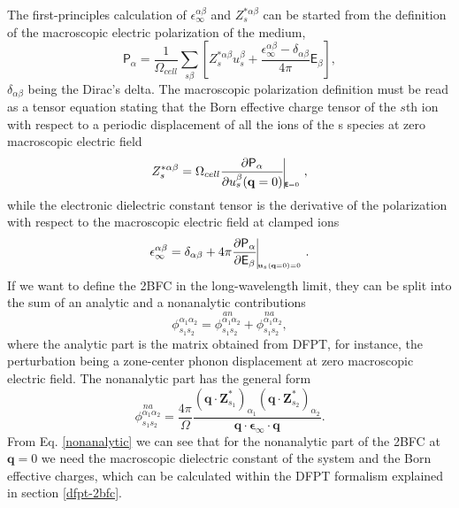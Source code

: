 The first-principles calculation of $\epsilon_{\infty}^{\alpha\beta}$ and $Z_{s}^{*\alpha\beta}$ can be started from the definition of the macroscopic electric polarization of the medium, 
\begin{equation}
 \mathsf{P}_{\alpha}=\frac{1}{\Omega_{cell}}\sum_{s\beta}\left[Z^{*\alpha\beta}_{s}u_{s}^{\beta}+\frac{\epsilon_{\infty}^{\alpha\beta}-\delta_{\alpha\beta}}{4\pi}\mathsf{E}_{\beta}\right],
\end{equation}
$\delta_{\alpha\beta}$ being the Dirac's delta. The macroscopic polarization definition must be read as a tensor equation stating that the Born effective charge tensor of the $s$th ion with respect to a periodic displacement of 
all the ions of the s species at zero macroscopic electric field
\begin{equation}
 Z^{*\alpha\beta}_{s}=\Omega_{cell}\frac{\partial \mathsf{P}_{\alpha}}{\partial u_{s}^{\beta}(\mathbf{q}=0)}\vline_{_{_{_{_{_{_{_{\boldsymbol{\mathsf{E}}=0}}}}}}}},
\end{equation}
while the electronic dielectric constant tensor is the derivative of the polarization with respect to the macroscopic electric field at clamped ions
\begin{equation}
 \epsilon_{\infty}^{\alpha\beta}=\delta_{\alpha\beta}+4\pi\frac{\partial\mathsf{P}_{\alpha}}{\partial\mathsf{E}_{\beta}}\vline_{_{_{_{_{_{_{_{\mathbf{u}_{s}(\mathbf{q}=0)=0}}}}}}}}.
\end{equation}
If we want to define the 2BFC in the long-wavelength limit, they can be split into the sum of an analytic and a nonanalytic contributions
\begin{equation}
 \phi_{s_{1}s_{2}}^{\alpha_{1}\alpha_{2}}=\overset{an}{\phi_{s_{1}s_{2}}^{\alpha_{1}\alpha_{2}}}+\overset{na}{\phi_{s_{1}s_{2}}^{\alpha_{1}\alpha_{2}}},
\end{equation}
where the analytic part is the matrix obtained from DFPT, for instance, the perturbation being a zone-center phonon displacement at zero macroscopic electric field. The nonanalytic part has the general form
\begin{equation}
\label{nonanalytic}
\overset{na}{\phi_{s_{1}s_{2}}^{\alpha_{1}\alpha_{2}}}=\frac{4\pi}{\Omega}\frac{(\mathbf{q}\cdot\mathbf{Z}^{*}_{s_{1}})_{\alpha_{1}}(\mathbf{q}\cdot\mathbf{Z}^{*}_{s_{2}})_{\alpha_{2}}}{\mathbf{q}\cdot\boldsymbol{
\epsilon}_{\infty}\cdot\mathbf{q}}.
\end{equation}
From Eq. \ref{nonanalytic} we can see that for the nonanalytic part of the 2BFC at $\mathbf{q}=0$ we need the macroscopic dielectric constant of the system and the Born effective charges, which can be calculated within 
the DFPT formalism explained in section \ref{dfpt-2bfc}\cite{gonze1997dynamical}. \\

